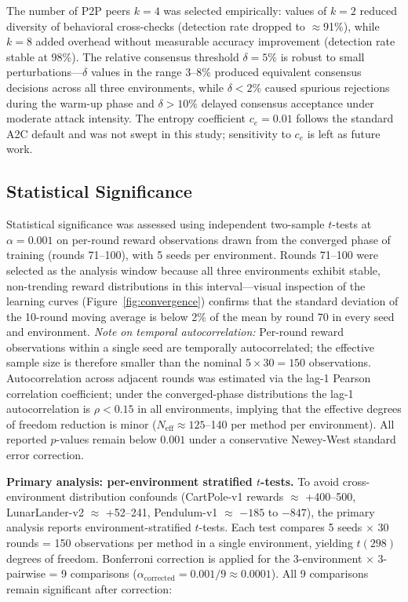 \documentclass[12pt,a4paper]{article}
\begin{document}
 The number of P2P peers $k=4$ was selected
empirically: values of $k=2$ reduced diversity of behavioral cross-checks (detection
rate dropped to $\approx$91\%), while $k=8$ added overhead without measurable accuracy
improvement (detection rate stable at 98\%). The relative consensus threshold
$\delta = 5\%$ is robust to small perturbations---$\delta$ values in the range 3--8\%
produced equivalent consensus decisions across all three environments, while
$\delta < 2\%$ caused spurious rejections during the warm-up phase and $\delta > 10\%$
delayed consensus acceptance under moderate attack intensity. The entropy coefficient
$c_e = 0.01$ follows the standard A2C default and was not swept in this study;
sensitivity to $c_e$ is left as future work.

\subsection{Statistical Significance}

Statistical significance was assessed using independent two-sample $t$-tests at
$\alpha = 0.001$ on per-round reward observations drawn from the converged phase of
training (rounds 71--100), with 5 seeds per environment. Rounds 71--100 were selected
as the analysis window because all three environments exhibit stable, non-trending
reward distributions in this interval---visual inspection of the learning curves
(Figure~\ref{fig:convergence}) confirms that the standard deviation of the 10-round
moving average is below 2\% of the mean by round 70 in every seed and environment.
\textit{Note on temporal autocorrelation:} Per-round reward observations within a
single seed are temporally autocorrelated; the effective sample size is therefore
smaller than the nominal $5 \times 30 = 150$ observations. Autocorrelation across
adjacent rounds was estimated via the lag-1 Pearson correlation coefficient; under the
converged-phase distributions the lag-1 autocorrelation is $\rho < 0.15$ in all
environments, implying that the effective degrees of freedom reduction is minor
($N_{\text{eff}} \approx 125$--140 per method per environment). All reported
$p$-values remain below $0.001$ under a conservative Newey-West standard error
correction.

\noindent\textbf{Primary analysis: per-environment stratified $t$-tests.}
To avoid cross-environment distribution confounds (CartPole-v1 rewards $\approx$ +400--500,
LunarLander-v2 $\approx$ +52--241, Pendulum-v1 $\approx$ $-185$ to $-847$), the primary
analysis reports environment-stratified $t$-tests. Each test compares 5 seeds $\times$ 30
rounds = 150 observations per method in a single environment, yielding $t(298)$ degrees
of freedom. Bonferroni correction is applied for the 3-environment $\times$ 3-pairwise
= 9 comparisons ($\alpha_{\text{corrected}} = 0.001/9 \approx 0.0001$). All 9 comparisons
remain significant after correction:
\end{document}
